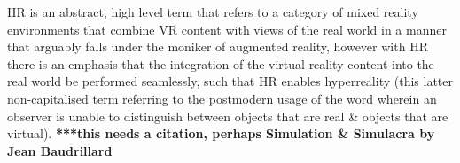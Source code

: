 HR is an abstract, high level term that refers to a category of mixed reality environments that combine VR content with views of the real world in a manner that arguably falls under the moniker of augmented reality, however with HR there is an emphasis that the integration of the virtual reality content into the real world be performed seamlessly, such that HR enables hyperreality (this latter non-capitalised term referring to the postmodern usage of the word wherein an observer is unable to distinguish between objects that are real \& objects that are virtual). \textbf{***this needs a citation, perhaps Simulation \& Simulacra by Jean Baudrillard}









